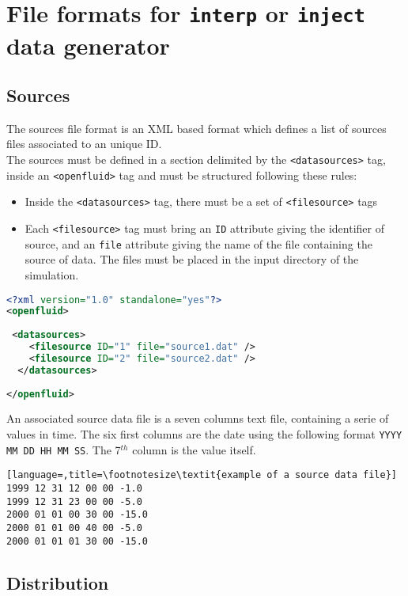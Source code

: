 \bigskip 

\section{File formats for \texttt{interp} or \texttt{inject} data generator}

\subsection{Sources}
The sources file format is an XML based format which defines a list of sources
files associated to an unique ID.\\
\noindent The sources must be defined in a section delimited by the
\texttt{<datasources>} tag, inside an \texttt{<openfluid>} tag and must be
structured following these rules:
\begin{itemize}
  \item Inside the \texttt{<datasources>} tag, there must be a set of
  \texttt{<filesource>} tags
  \item Each \texttt{<filesource>} tag must bring an \texttt{ID}
  attribute giving the identifier of source, and an \texttt{file}
  attribute giving the name of the file containing the source of data. The files
  must be placed in the input directory of the simulation.
\end{itemize}

\begin{lstlisting}[language=xml,title=\footnotesize\textit{example of a sources list file}]
<?xml version="1.0" standalone="yes"?>
<openfluid>
 
 <datasources>
    <filesource ID="1" file="source1.dat" />
    <filesource ID="2" file="source2.dat" />    
  </datasources>
  
</openfluid>
\end{lstlisting}

\bigskip
An associated source data file is a seven columns text file, containing a serie
of values in time. The six first columns are the date using the following format
\texttt{YYYY MM DD HH MM SS}. The 7$^{th}$ column is the value itself.

 \begin{lstlisting}[language=,title=\footnotesize\textit{example of a source data file}]
1999 12 31 12 00 00 -1.0
1999 12 31 23 00 00 -5.0
2000 01 01 00 30 00 -15.0
2000 01 01 00 40 00 -5.0
2000 01 01 01 30 00 -15.0
\end{lstlisting}


\subsection{Distribution}

